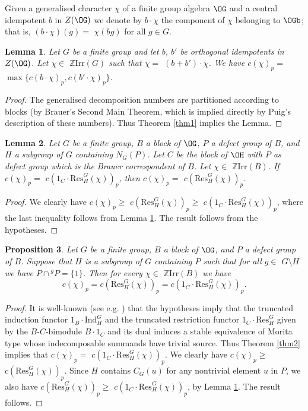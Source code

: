 \documentclass{amsart} %
\theoremstyle{plain}\newtheorem{Theorem}{Theorem}[section]
\theoremstyle{plain}\newtheorem{Conjecture}[Theorem]{Conjecture}
\theoremstyle{plain}\newtheorem{Corollary}[Theorem]{Corollary}
\theoremstyle{plain}\newtheorem{Lemma}[Theorem]{Lemma}
\theoremstyle{plain}\newtheorem{Proposition}[Theorem]{Proposition}
\theoremstyle{definition}\newtheorem{Definition}[Theorem]{Definition}
\theoremstyle{definition}\newtheorem{Example}[Theorem]{Example}
\theoremstyle{definition}\newtheorem{Examples}[Theorem]{Examples}
\theoremstyle{definition}\newtheorem{Remark}[Theorem]{Remark}
\theoremstyle{definition}\newtheorem{Remarks}[Theorem]{Remarks}
\theoremstyle{plain}\newtheorem{Statement}[Theorem]{}
\def\Z{{\mathbb Z}}
\def\Ind{\mathrm{Ind}}           \def\tenK{\otimes_K}
\def\Irr{\mathrm{Irr}}           \def\tenK{\otimes_K}
\def\Res{\mathrm{Res}}           \def\tenOR{\otimes_{\mathcal{O}R}}
\begin{document}
Given a generalised character $\chi$  of a finite group algebra $\OG$
and a central idempotent $b$ in $Z(\OG)$ we denote by $b\cdot \chi$ the
component of $\chi$ belonging to $\OGb$; that is, $(b\cdot \chi)(g)=$ 
$\chi(bg)$  for all $g\in G$. 

\begin{Lemma} \label{lem10}
Let $G$ be a finite group and let $b$, $b'$ be orthogonal idempotents
in $Z(\OG)$. Let $\chi\in$ $\Z\Irr(G)$ such that $\chi=$ $(b+b')\cdot \chi$.
We have  $c(\chi)_p =$ $\max\{ c(b\cdot \chi)_p, c(b'\cdot\chi)_p\}$. 
\end{Lemma} 

\begin{proof}
The generalised decomposition numbers are partitioned according to
blocks (by Brauer's Second Main Theorem, which is implied directly by Puig's
description of these numbers). Thus Theorem \ref{thm1} implies the Lemma.
\end{proof}

\begin{Lemma} \label{lem11}
Let $G$ be a finite group, $B$ a block of $\OG$, $P$ a defect group of
$B$, and $H$ a subgroup of $G$ containing $N_G(P)$. Let $C$ be the block
of $\OH$ with $P$ as defect group which is the Brauer correspondent of $B$.
Let $\chi\in$ $\Z\Irr(B)$. If $c(\chi)_p=$ $c(1_C\cdot \Res^G_H(\chi))_p$,
then $c(\chi)_p=$ $c(\Res^G_H(\chi))_p$.
\end{Lemma}

\begin{proof}
We clearly have $c(\chi)_p \geq$ $ c(\Res^G_H(\chi))_p \geq$
$  c(1_C\cdot \Res^G_H(\chi))_p$, where the last inequality 
follows from Lemma \ref{lem10}. The result follows from the 
hypotheses.
\end{proof}


\begin{Proposition}\label{TI-Prop}
Let $G$ be a finite group, $B$ a block of $\OG$, and $P$ a defect group 
of $B$. Suppose that $H$ is a subgroup of $G$ containing $P$ such that
for all $g\in $ $G\setminus H$ we have $P\cap {^gP} = \{1\}$.
Then for every $\chi\in$ $\Z\Irr(B)$ we have 
$$c(\chi)_p = c(\Res^G_H(\chi))_p=  c(1_C\cdot \Res^G_H(\chi))_p.$$
\end{Proposition}

\begin{proof}
It is well-known (see e.g. \cite[Theorem 9.8.6]{LiBookII}) that the hypotheses 
imply that the truncated induction functor $1_B\cdot\Ind^G_H$ and the truncated 
restriction functor $1_C\cdot\Res^G_H$  
given by the $B$-$C$-bimodule $B\cdot 1_C$ and its dual induces a stable
equivalence of Morita type whose indecomposable summands have trivial 
source. Thus Theorem \ref{thm2} implies that 
$c(\chi)_p =$ $ c(1_C\cdot \Res^G_H(\chi))_p$.
We clearly have $c(\chi)_p\geq$ $c(\Res^G_H(\chi))_p$.
Since $H$ contains $C_G(u)$ for any nontrivial element $u$ in $P$, 
we also have $c(\Res^G_H(\chi))_p\geq$
$c(1_C\cdot \Res^G_H(\chi))_p$, by Lemma \ref{lem10}. 
The result follows.
\end{proof}
\end{document}
